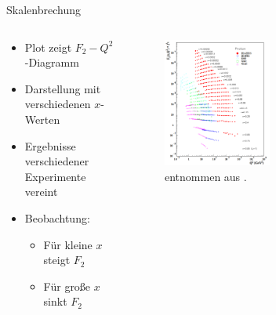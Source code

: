 \documentclass[aspectratio=1610, 9pt]{beamer}
\begin{document}
\begin{frame}{Skalenbrechung}
  \begin{columns}
    \begin{column}{0.3\textwidth}
        \begin{itemize}
          \item{Plot zeigt $F_2-Q^2$-Diagramm}
          \item{Darstellung mit verschiedenen $x$-Werten}
          \item{Ergebnisse verschiedener Experimente vereint}
          \item{Beobachtung:}
          \begin{itemize}
            \item{Für kleine $x$ steigt $F_2$}
            \item{Für große $x$ sinkt $F_2$}
          \end{itemize}
        \end{itemize}
    \end{column}

    \begin{column}{0.7\textwidth}
      \begin{figure}
        \centering
        \includegraphics[width=0.51\textwidth]{images/Skalen.png}
        \caption{entnommen aus \cite{Paper-TP}.}
      \end{figure}
    \end{column}
  \end{columns}
\end{frame}
\end{document}
